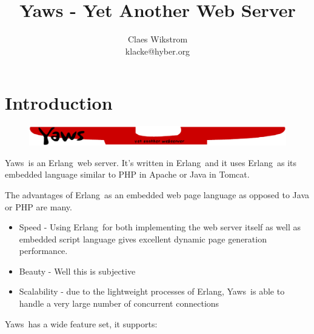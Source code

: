 \documentclass[11pt,oneside,english]{book}
\newcommand{\Erlang}            %
        {{\sc Erlang}}
\newcommand{\Yaws}            %
        {{\sc Yaws}}
\begin{document}
\title{Yaws - Yet Another Web Server}


\author{Claes Wikstrom\\
klacke@hyber.org}





\maketitle
\tableofcontents{}



\chapter{Introduction}


\begin{figure}[h]
\begin{center}

 \includegraphics[scale=0.6] {yaws_head}

\end{center}
\end{figure}

\Yaws\  is an \Erlang\  web server. It's written in \Erlang\  and it uses
\Erlang\  as its embedded language similar to PHP in Apache or Java in Tomcat.

The advantages of \Erlang\  as an embedded web page language as opposed to
Java or PHP are many.
\begin{itemize}

\item{Speed - Using \Erlang\  for both implementing the web server itself as well
as embedded script language gives excellent dynamic page generation
performance.}

\item{Beauty - Well this is subjective}

\item{Scalability - due to the lightweight processes of \Erlang{}, \Yaws\
is able to handle a very large number of concurrent connections}

\end{itemize}

\Yaws\  has a wide feature set, it supports:
\end{document}
